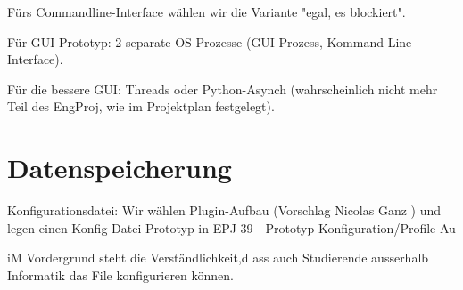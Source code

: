 \documentclass[a4paper]{article}
\let\oldsection\section
\renewcommand\section{\clearpage\oldsection}
\begin{document}
Fürs Commandline-Interface wählen wir die Variante "egal, es blockiert".

Für GUI-Prototyp: 2 separate OS-Prozesse (GUI-Prozess, Kommand-Line-Interface).

Für die bessere GUI: Threads oder Python-Asynch (wahrscheinlich nicht mehr Teil des EngProj, wie im Projektplan festgelegt).

\section{Datenspeicherung}


Konfigurationsdatei: Wir wählen Plugin-Aufbau (Vorschlag  Nicolas Ganz ) und legen einen Konfig-Datei-Prototyp in EPJ-39 - Prototyp Konfiguration/Profile Au

iM Vordergrund steht die Verständlichkeit,d ass auch Studierende ausserhalb Informatik das File konfigurieren können.
\end{document}
